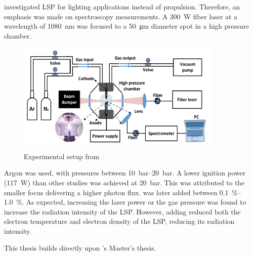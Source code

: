 

        \textcite{luCharacteristicDiagnosticsLaserStabilized2022a} investigated LSP for lighting applications instead of propulsion. Therefore, an emphasis was made on spectroscopy measurements. A \qty{300}{W} fiber laser at a wavelength of \qty{1080}{nm} was focused to a \qty{50}{μm} diameter spot in a high pressure chamber.
        \begin{figure}[!ht]
            \centering
            \includegraphics[width=0.9\textwidth]{assets/2 background/Lu apparatus.png}
            \caption{Experimental setup from \textcite{luCharacteristicDiagnosticsLaserStabilized2022a}}
            \label{fig:Lu apparatus}
        \end{figure}
        Argon was used, with pressures between \qtyrange{10}{20}{bar}. A lower ignition power (\qty{117}{W}) than other studies was achieved at \qty{20}{bar}. This was attributed to the smaller focus delivering a higher photon flux.  was later added between \qtyrange{0.1}{1.0}{\%}. As expected, increasing the laser power or the gas pressure was found to increase the radiation intensity of the LSP. However, adding  reduced both the electron temperature and electron density of the LSP, reducing its radiation intensity.


        This thesis builds directly upon \textcite{duplayArgonLaserPlasmaThruster2024a}'s Master's thesis.

